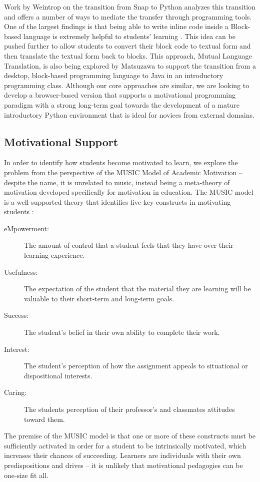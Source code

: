 \documentclass{sig-alternate}
\begin{document}
Work by Weintrop on the transition from Snap to Python analyzes this transition and offers a number of ways to mediate the transfer through programming tools. 
One of the largest findings is that being able to write inline code inside a Block-based language is extremely helpful to students' learning \cite{Weintrop}.
This idea can be pushed further to allow students to convert their block code to textual form and then translate the textual form back to blocks.
This approach, Mutual Language Translation, is also being explored by Matsuzawa\cite{Matsuzawa} to support the transition from a desktop, block-based programming language to Java in an introductory programming class. 
Although our core approaches are similar, we are looking to develop a browser-based version that supports a motivational programming paradigm with a strong long-term goal towards the development of a mature introductory Python environment that is ideal for novices from external domains.

\subsection{Motivational Support}

In order to identify how students become motivated to learn, we explore the problem from the perspective of the MUSIC Model of Academic Motivation -- despite the name, it is unrelated to music, instead being a meta-theory of motivation developed specifically for motivation in education.
The MUSIC model is a well-supported theory that identifies five key constructs in motivating students \cite{jones-description}:
\begin{description}
	\item[eMpowerment:] The amount of control that a student feels that they have over their learning experience.
	\item[Usefulness:] The expectation of the student that the material they are learning will be valuable to their short-term and long-term goals.
	\item[Success:] The student's belief in their own ability to complete their work.
	\item[Interest:] The student's perception of how the assignment appeals to situational or dispositional interests.
	\item[Caring:] The students perception of their professor's and classmates attitudes toward them.
\end{description}
The premise of the MUSIC model is that one or more of these constructs must be sufficiently activated in order for a student to be intrinsically motivated, which increases their chances of succeeding.
Learners are individuals with their own predispositions and drives -- it is unlikely that motivational pedagogies can be one-size fit all.
\end{document}
